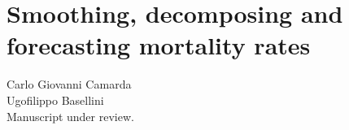 \documentclass[Thesis]{subfiles}
\begin{document}
\newpage
\chapter{Smoothing, decomposing and forecasting mortality rates}\label{Ch6}
\thispagestyle{empty}
\pagecolor{pagecolor}\afterpage{\nopagecolor}
\vspace{1cm}
\Large
Carlo Giovanni Camarda\\
Ugofilippo Basellini
\vspace{2cm}
\\ Manuscript under review.\\

\clearpage

\thispagestyle{empty}
\pagecolor{pagecolor}\afterpage{\nopagecolor}
\section*{}
\clearpage

\end{document}
